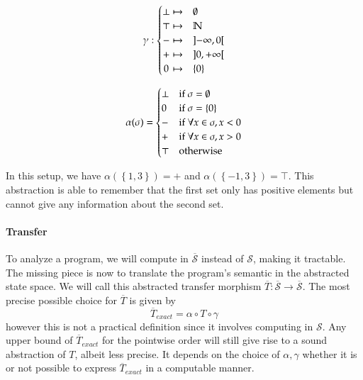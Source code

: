 \documentclass[11pt]{article}
\renewcommand{\S}{\mathcal{S}}
\newcommand{\oS}{\overline{\mathcal{S}}}
\begin{document}
\hfill

\begin{minipage}{0.4\linewidth}
\[
\gamma:
\begin{cases}
\hfill \bot \hfill \mapsto & \emptyset \\
\hfill \top \hfill \mapsto & \mathbb{N} \\
\hfill -   \hfill \mapsto & \left]-\infty,0\right[ \\
\hfill +   \hfill \mapsto & \left]0,+\infty\right[ \\
\hfill 0   \hfill \mapsto & \left\{0\right\} \\
\end{cases}
\]
\end{minipage}
\quad
\begin{minipage}{0.4\linewidth}
\[
\alpha(\sigma) =
\begin{cases}
\bot \hfill & \text{if } \sigma = \emptyset \\
 0   \hfill & \text{if } \sigma = \left\{0\right\} \\
 -   \hfill & \text{if } \forall x\in\sigma, x < 0 \\
 +   \hfill & \text{if } \forall x\in\sigma, x > 0 \\
\top \hfill & \text{otherwise} \\
\end{cases}
\]
\end{minipage}

\hfill

In this setup, we have $\alpha(\left\{1,3\right\}) = +$ and $\alpha(\left\{-1,3\right\}) = \top$. This abstraction is able to remember that the first set only has positive elements but cannot give any information about the second set.

\paragraph{Transfer} To analyze a program, we will compute in $\oS$ instead of $\S$, making it tractable. The missing piece is now to translate the program's semantic in the abstracted state space. We will call this abstracted transfer morphism $\overline{T}:\oS\to\oS$. The most precise possible choice for $\overline{T}$ is given by
\[ \overline{T}_{exact} = \alpha\circ T\circ \gamma \]
however this is not a practical definition since it involves computing in $\S$. Any upper bound of $\overline{T}_{exact}$ for the pointwise order will still give rise to a sound abstraction of $T$, albeit less precise. It depends on the choice of $\alpha,\gamma$ whether it is or not possible to express $\overline{T}_{exact}$ in a computable manner.
\end{document}
